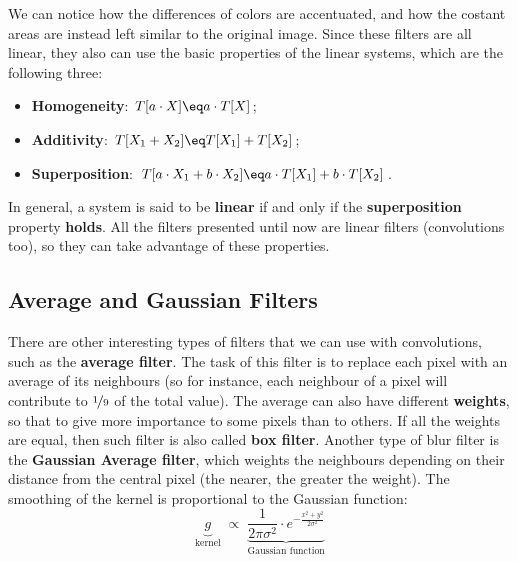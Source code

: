 \begin{center}
\end{center}

We can notice how the differences of colors are accentuated, and how the costant areas are instead left similar to the original image.
\nwl
Since these filters are all linear, they also can use the basic properties of the linear systems, which are the following three:
\begin{itemize}
    \item \textbf{Homogeneity}: $T[a \cdot X] \eq a \cdot T[X]$;
    \item \textbf{Additivity}: $T[X_1 + X_2] \eq T[X_1] + T[X_2]$;
    \item \textbf{Superposition}: $T[a \cdot X_1 + b \cdot X_2] \eq a \cdot T[X_1] + b \cdot T[X_2]$.
\end{itemize}

In general, a system is said to be \textbf{linear} if and only if the \textbf{superposition} property \textbf{holds}. All the filters presented until now are linear filters (convolutions too), so they can take advantage of these properties.

\subsection{Average and Gaussian Filters}

There are other interesting types of filters that we can use with convolutions, such as the \textbf{average filter}. The task of this filter is to replace each pixel with an average of its neighbours (so for instance, each neighbour of a pixel will contribute to $\nicefrac{1}{9}$ of the total value). The average can also have different \textbf{weights}, so that to give more importance to some pixels than to others. If all the weights are equal, then such filter is also called \textbf{box filter}.
\nwl
Another type of blur filter is the \textbf{Gaussian Average filter}, which weights the neighbours depending on their distance from the central pixel (the nearer, the greater the weight). The smoothing of the kernel is proportional to the Gaussian function:
\[ \underbrace{g}_{\text{kernel}} \; \propto \; \underbrace{\frac{1}{2 \pi \sigma^2} \cdot e^{- \frac{x^2 + y^2}{2 \sigma^2}}}_{\text{Gaussian function}} \]

